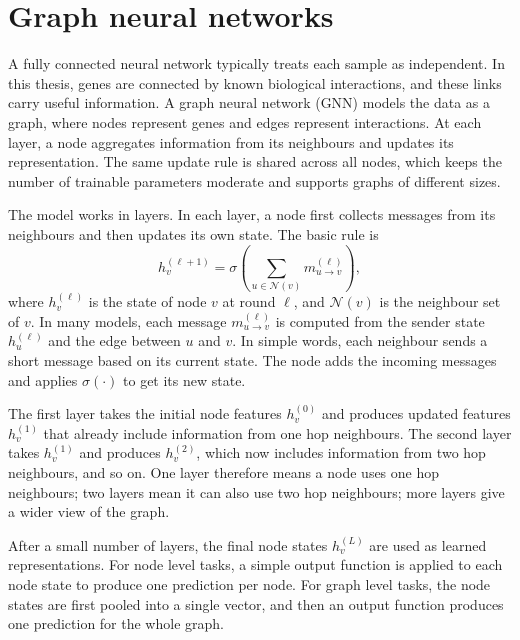 \section{Graph neural networks}
\noindent A fully connected neural network typically treats each sample as independent. In this thesis, genes are connected by known biological interactions, and these links carry useful information. A graph neural network (GNN) models the data as a graph, where nodes represent genes and edges represent interactions. At each layer, a node aggregates information from its neighbours and updates its representation. The same update rule is shared across all nodes, which keeps the number of trainable parameters moderate and supports graphs of different sizes.


\noindent The model works in layers. In each layer, a node first collects messages from its neighbours and then updates its own state.
The basic rule is
\begin{equation}
h_{v}^{(\ell+1)} = \sigma\!\left(\sum_{u \in \mathcal{N}(v)} m_{u\rightarrow v}^{(\ell)}\right),
\end{equation}
where $h_{v}^{(\ell)}$ is the state of node $v$ at round $\ell$, and $\mathcal{N}(v)$ is the neighbour set of $v$. In many models, each message $m_{u\rightarrow v}^{(\ell)}$ is computed from the sender state $h_{u}^{(\ell)}$ and the edge between $u$ and $v$. In simple words, each neighbour sends a short message based on its current state. The node adds the incoming messages and applies $\sigma(\cdot)$ to get its new state.

\noindent The first layer takes the initial node features $h_{v}^{(0)}$ and produces updated features $h_{v}^{(1)}$ that already include information from one hop neighbours. The second layer takes $h_{v}^{(1)}$ and produces $h_{v}^{(2)}$, which now includes information from two hop neighbours, and so on. One layer therefore means a node uses one hop neighbours; two layers mean it can also use two hop neighbours; more layers give a wider view of the graph.

\noindent After a small number of layers, the final node states $h_{v}^{(L)}$ are used as learned representations. For node level tasks, a simple output function is applied to each node state to produce one prediction per node. For graph level tasks, the node states are first pooled into a single vector, and then an output function produces one prediction for the whole graph.

